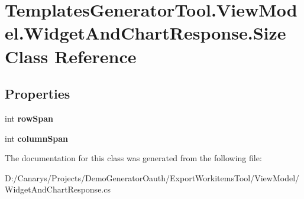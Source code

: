 \hypertarget{class_templates_generator_tool_1_1_view_model_1_1_widget_and_chart_response_1_1_size}{}\section{Templates\+Generator\+Tool.\+View\+Model.\+Widget\+And\+Chart\+Response.\+Size Class Reference}
\label{class_templates_generator_tool_1_1_view_model_1_1_widget_and_chart_response_1_1_size}
\subsection*{Properties}
\begin{DoxyCompactItemize}
\item 
\mbox{\label{class_templates_generator_tool_1_1_view_model_1_1_widget_and_chart_response_1_1_size_a6bfe41ace6ca24ae523c35944624128e}} 
int {\bfseries row\+Span}
\item 
\mbox{\label{class_templates_generator_tool_1_1_view_model_1_1_widget_and_chart_response_1_1_size_a59f85888773e62833b16650db365026d}} 
int {\bfseries column\+Span}
\end{DoxyCompactItemize}


The documentation for this class was generated from the following file\+:\begin{DoxyCompactItemize}
\item 
D\+:/\+Canarys/\+Projects/\+Demo\+Generator\+Oauth/\+Export\+Workitems\+Tool/\+View\+Model/Widget\+And\+Chart\+Response.\+cs\end{DoxyCompactItemize}
